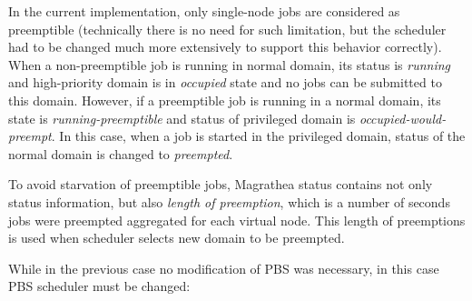 \documentclass[a4paper]{article}
\begin{document}
In the current implementation, only single-node jobs are considered as
preemptible (technically there is no need for such limitation, but the
scheduler had to be changed much more extensively to support this behavior
correctly). When a non-preemptible job is running in normal domain, its status
is \textit{running} and high-priority domain is in \textit{occupied} state and
no jobs can be submitted to this domain. However, if a preemptible job is
running in a normal domain, its state is \textit{running-preemptible} and
status of privileged domain is \textit{occupied-would-preempt}. In this case,
when a job is started in the privileged domain, status of the normal domain is
changed to \textit{preempted}.

To avoid starvation of preemptible jobs, Magrathea status contains not only
status information, but also \textit{length of preemption}, which is a number
of seconds jobs were preempted aggregated for each virtual node.  This length
of preemptions is used when scheduler selects new domain to be preempted.

While in the previous case no modification of PBS was necessary, in this case
PBS scheduler must be changed:
\end{document}

